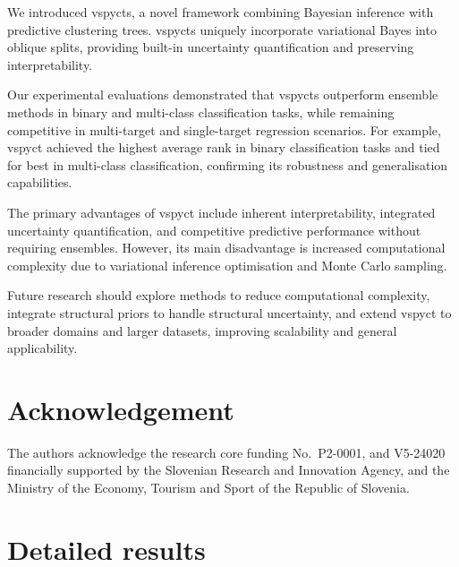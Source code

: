 \documentclass[3p,review,authoryear]{elsarticle}
\begin{document}
We introduced \glspl{vspyct}, a novel framework combining Bayesian inference with predictive clustering trees.
\Glspl{vspyct} uniquely incorporate variational Bayes into oblique splits, providing built-in uncertainty quantification and preserving interpretability.

Our experimental evaluations demonstrated that \glspl{vspyct} outperform ensemble methods in binary and multi-class classification tasks, while remaining competitive in multi-target and single-target regression scenarios.
For example, \gls{vspyct} achieved the highest average rank in binary classification tasks and tied for best in multi-class classification, confirming its robustness and generalisation capabilities.

The primary advantages of \gls{vspyct} include inherent interpretability, integrated uncertainty quantification, and competitive predictive performance without requiring ensembles.
However, its main disadvantage is increased computational complexity due to variational inference optimisation and Monte Carlo sampling.

Future research should explore methods to reduce computational complexity, integrate structural priors to handle structural uncertainty, and extend \gls{vspyct} to broader domains and larger datasets, improving scalability and general applicability.


\section*{Acknowledgement}
The authors acknowledge the research core funding No.\ P2-0001, and V5-24020 financially supported by the Slovenian Research and Innovation Agency, and the Ministry of the Economy, Tourism and Sport of the Republic of Slovenia.





\appendix
\section{Detailed results}
\label{app:res}
\end{document}
